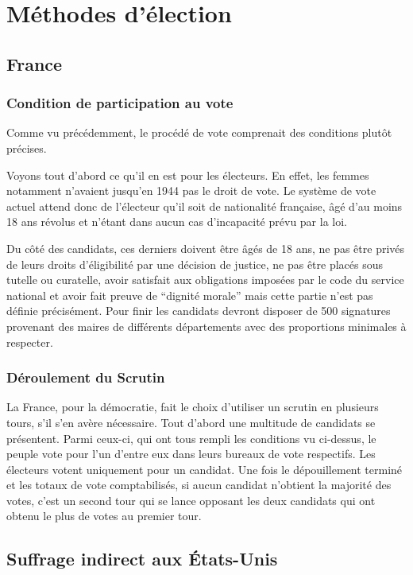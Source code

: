 \documentclass[11pt,a4paper]{report}
\begin{document}
\chapter{Méthodes d'élection}
\section{France} %
\subsection{Condition de participation au vote}

Comme vu précédemment, le procédé de vote comprenait des conditions plutôt précises.

Voyons tout d'abord ce qu'il en est pour les électeurs.
En effet, les femmes notamment n’avaient jusqu'en 1944 \nocite{wiki:droitvotefemmes} pas le droit de vote.
Le système de vote actuel attend donc de l'électeur qu’il soit de nationalité française, âgé d'au moins 18 ans révolus et n’étant dans aucun cas d’incapacité prévu par la loi.

Du côté des candidats, ces derniers doivent être âgés de 18 ans, ne pas être privés de leurs droits d’éligibilité par une décision de justice, ne pas être placés sous tutelle ou curatelle, avoir satisfait aux obligations imposées par le code du service national et avoir fait preuve de “dignité morale” mais cette partie n’est pas définie précisément.
Pour finir les candidats devront disposer de 500 signatures provenant des maires de différents départements avec des proportions minimales à respecter.

\subsection{Déroulement du Scrutin}

La France, pour la démocratie, fait le choix d'utiliser un scrutin en plusieurs tours, s'il s'en avère nécessaire.
Tout d’abord une multitude de candidats se présentent.
Parmi ceux-ci, qui ont tous rempli les conditions vu ci-dessus, le peuple vote pour l’un d’entre eux dans leurs bureaux de vote respectifs.
Les électeurs votent uniquement pour un candidat.
Une fois le dépouillement terminé et les totaux de vote comptabilisés, si aucun candidat n’obtient la majorité des votes, c’est un second tour qui se lance opposant les deux candidats qui ont obtenu le plus de votes au premier tour.

\section{Suffrage indirect aux États-Unis}
\end{document}
